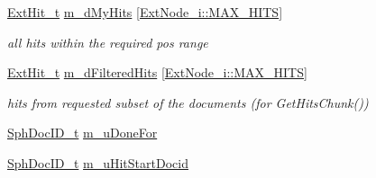 \begin{DoxyCompactItemize}
\hyperlink{structExtHit__t}{Ext\-Hit\-\_\-t} \hyperlink{classBufferedNode__c_a0c0a18060fd9ffb4e0845bc8200925df}{m\-\_\-d\-My\-Hits} \mbox{[}\hyperlink{classExtNode__i_a79b81cba51253fdbe56fd3595fac9ab4}{Ext\-Node\-\_\-i\-::\-M\-A\-X\-\_\-\-H\-I\-T\-S}\mbox{]}
\begin{DoxyCompactList}\small\item\em all hits within the required pos range \end{DoxyCompactList}\item 
\hyperlink{structExtHit__t}{Ext\-Hit\-\_\-t} \hyperlink{classBufferedNode__c_a2044ff03a792afd4ace628fafa063487}{m\-\_\-d\-Filtered\-Hits} \mbox{[}\hyperlink{classExtNode__i_a79b81cba51253fdbe56fd3595fac9ab4}{Ext\-Node\-\_\-i\-::\-M\-A\-X\-\_\-\-H\-I\-T\-S}\mbox{]}
\begin{DoxyCompactList}\small\item\em hits from requested subset of the documents (for Get\-Hits\-Chunk()) \end{DoxyCompactList}\item 
\hyperlink{sphinx_8h_a3176771631c12a9e4897272003e6b447}{Sph\-Doc\-I\-D\-\_\-t} \hyperlink{classBufferedNode__c_af91cf22314ed5848b6b5c4fdec87ebcb}{m\-\_\-u\-Done\-For}
\item 
\hyperlink{sphinx_8h_a3176771631c12a9e4897272003e6b447}{Sph\-Doc\-I\-D\-\_\-t} \hyperlink{classBufferedNode__c_ae0287f95dec23839698f1a8e54799142}{m\-\_\-u\-Hit\-Start\-Docid}
\end{DoxyCompactItemize}


